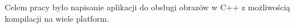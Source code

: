 \par
Celem pracy było napisanie aplikacji do obsługi obrazów \DICOM w C++ z możliwością kompilacji na wiele platform.